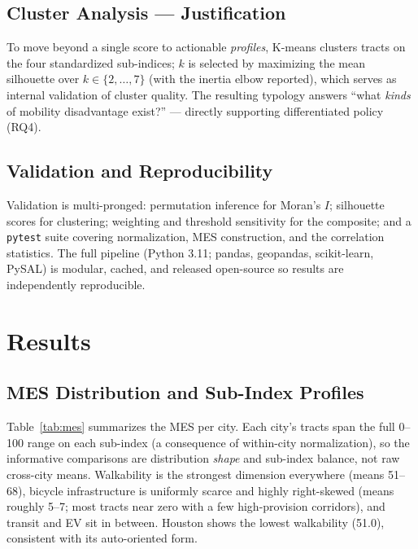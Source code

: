 \documentclass[11pt]{article}
\begin{document}
\subsection{Cluster Analysis --- Justification}
To move beyond a single score to actionable \emph{profiles}, K-means clusters
tracts on the four standardized sub-indices; $k$ is selected by maximizing the
mean silhouette over $k\in\{2,\dots,7\}$ (with the inertia elbow reported), which
serves as internal validation of cluster quality. The resulting typology answers
``what \emph{kinds} of mobility disadvantage exist?'' --- directly supporting
differentiated policy (RQ4).

\subsection{Validation and Reproducibility}
Validation is multi-pronged: permutation inference for Moran's $I$; silhouette
scores for clustering; weighting and threshold sensitivity for the composite; and
a \texttt{pytest} suite covering normalization, MES construction, and the
correlation statistics. The full pipeline (Python 3.11; pandas, geopandas,
scikit-learn, PySAL) is modular, cached, and released open-source so results are
independently reproducible.

\section{Results}

\subsection{MES Distribution and Sub-Index Profiles}
Table~\ref{tab:mes} summarizes the MES per city. Each city's tracts span the full
0--100 range on each sub-index (a consequence of within-city normalization), so
the informative comparisons are distribution \emph{shape} and sub-index balance,
not raw cross-city means. Walkability is the strongest dimension everywhere
(means 51--68), bicycle infrastructure is uniformly scarce and highly
right-skewed (means roughly 5--7; most tracts near zero with a few high-provision
corridors), and transit and EV sit in between. Houston shows the lowest
walkability (51.0), consistent with its auto-oriented form.
\end{document}
